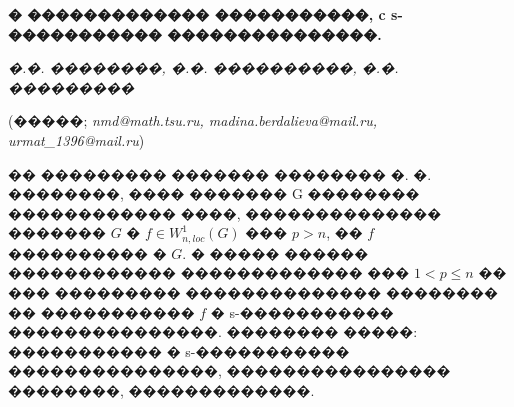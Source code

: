 \documentclass[a5paper, 12pt, openbib]{report}
\begin{document}
\begin{center}
    {\bf � ������������� �����������, c s-����������� ���������������.}

    {\it �.�. ��������, �.�. ����������, �.�. ���������}

    (�����; {\it nmd@math.tsu.ru, madina.berdalieva@mail.ru, urmat\_1396@mail.ru})
\end{center}

�� ��������� ������� �������� �. �. ��������, ���� �������  G �������� ������������ ����,  �������������� ������� $G$ � $f \in W^{1}_{n,loc}(G)$ ��� $p>n$, �� $f$ ���������� � $G$. � ����� ������ ������������ �������������  ��� $1<p\leq n$ �� ��� ��������� �������������� �������� �� �����������  $f$ � s-����������� ���������������. 
�������� �����: ����������� � s-����������� ���������������, ���������������� ��������, �������������.
\end{document}

